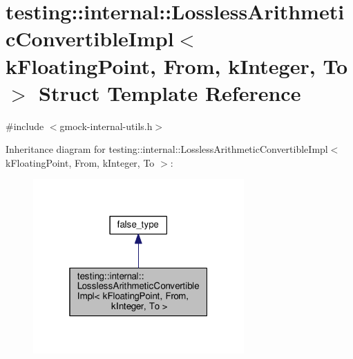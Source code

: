 \hypertarget{structtesting_1_1internal_1_1_lossless_arithmetic_convertible_impl_3_01k_floating_point_00_01_from_00_01k_integer_00_01_to_01_4}{}\section{testing\+:\+:internal\+:\+:Lossless\+Arithmetic\+Convertible\+Impl$<$ k\+Floating\+Point, From, k\+Integer, To $>$ Struct Template Reference}
\label{structtesting_1_1internal_1_1_lossless_arithmetic_convertible_impl_3_01k_floating_point_00_01_from_00_01k_integer_00_01_to_01_4}


{\ttfamily \#include $<$gmock-\/internal-\/utils.\+h$>$}



Inheritance diagram for testing\+:\+:internal\+:\+:Lossless\+Arithmetic\+Convertible\+Impl$<$ k\+Floating\+Point, From, k\+Integer, To $>$\+:
\nopagebreak
\begin{figure}[H]
\begin{center}
\leavevmode
\includegraphics[width=229pt]{structtesting_1_1internal_1_1_lossless_arithmetic_convertible_impl_3_01k_floating_point_00_01_fr9f99dcae710569022654472098efd690}
\end{center}
\end{figure}


